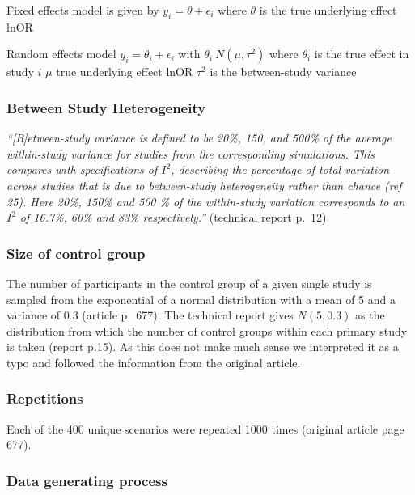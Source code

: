 \documentclass[
  english,
  doc,floatsintext,draftall]{apa6}
\begin{document}
Fixed effects model is given by
\(y_i=\theta + \epsilon_i\)
where \(\theta\) is the true underlying effect lnOR

Random effects model
\(y_i = \theta_i + \epsilon_i\)
with \(\theta_i~ N(\mu,\tau^2)\)
where \(\theta_i\) is the true effect in study \(i\)
\(\mu\) true underlying effect lnOR
\(\tau^2\) is the between-study variance

\hypertarget{between-study-heterogeneity}{%
\subsubsection{Between Study Heterogeneity}\label{between-study-heterogeneity}}

\emph{\enquote{{[}B{]}etween-study variance is defined to be 20\%, 150, and 500\% of the average within-study variance for studies from the corresponding simulations.
This compares with specifications of \(I^2\), describing the percentage of total variation across studies that is due to between-study heterogeneity rather than chance (ref 25). Here 20\%, 150\% and 500 \% of the within-study variation corresponds to an \(I^2\) of 16.7\%, 60\% and 83\% respectively.}} (technical report p.~12)

\hypertarget{size-of-control-group}{%
\subsubsection{Size of control group}\label{size-of-control-group}}

The number of participants in the control group of a given single study is sampled from the exponential of a normal distribution with a mean of 5 and a variance of 0.3 (article p.~677).
The technical report gives \(N(5, 0.3)\) as the distribution from which the number of control groups within each primary study is taken (report p.15). As this does not make much sense we interpreted it as a typo and followed the information from the original article.

\hypertarget{repetitions}{%
\subsubsection{Repetitions}\label{repetitions}}

Each of the 400 unique scenarios were repeated 1000 times (original article page 677).

\hypertarget{data-generating-process}{%
\subsubsection{Data generating process}\label{data-generating-process}}
\end{document}
